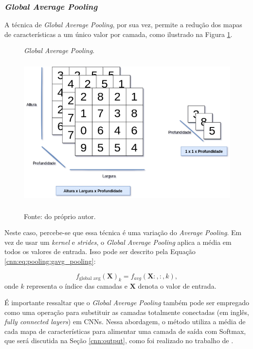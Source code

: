 \subsubsection{\textit{Global Average Pooling}}
\label{cnn:pooling:global_avg_pooling}
A técnica de \textit{Global Average Pooling}, por sua vez, permite a redução dos mapas de características a um único valor por camada, como ilustrado na Figura \ref{cnn:fig:8}.

\begin{figure}[H]
    \centering
    \caption{\textit{Global Average Pooling}.}
    \includegraphics[height=3in]{recursos/imagens/deep/global_average_pooling.png}
    \label{cnn:fig:8}
    
    \caption*{Fonte: do próprio autor.}
\end{figure}

Neste caso, percebe-se que essa técnica é uma variação do \textit{Average Pooling}. Em vez de usar um \textit{kernel} e \textit{strides}, o \textit{Global Average Pooling} aplica a média em todos os valores de entrada. Isso pode ser descrito pela Equação \ref{cnn:eq:pooling:gavg_pooling}:

\begin{equation}
    \label{cnn:eq:pooling:gavg_pooling}
    f_{\text{global avg}}(\boldsymbol{X})_{k} = f_{avg}(\boldsymbol{X}:,:,k),
\end{equation}
onde $k$ representa o índice das camadas e $\boldsymbol{X}$ denota o valor de entrada.

É importante ressaltar que o \textit{Global Average Pooling} também pode ser empregado como uma operação para substituir as camadas totalmente conectadas (em inglês, \textit{fully connected layers}) em CNNs. Nessa abordagem, o método utiliza a média de cada mapa de características para alimentar uma camada de saída com Softmax, que será discutida na Seção \ref{cnn:output}, como foi realizado no trabalho de \cite{Kumar2021Multi-classPooling}.


